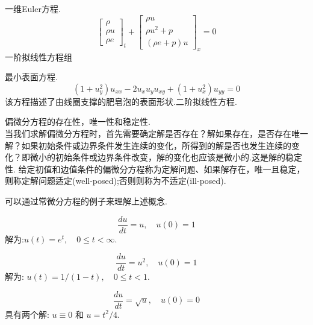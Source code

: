 	\begin{myexample}
		一维Euler方程.
		\begin{equation}
			\begin{bmatrix}
				\rho \\
				\rho u \\
				\rho e
			\end{bmatrix}_t + 
			\begin{bmatrix}
				\rho u \\
				\rho u^2 + p \\
				(\rho e + p)u
			\end{bmatrix}_x = 0
		\end{equation}
		一阶拟线性方程组
	\end{myexample}

	\begin{myexample}
		最小表面方程.
		\begin{equation}
			(1+u_y^2)u_{xx} - 2u_xu_yu_{xy} + (1+u_x^2)u_{yy} = 0
		\end{equation}
		该方程描述了由线圈支撑的肥皂泡的表面形状.二阶拟线性方程.
	\end{myexample}

	\begin{mydef}
		偏微分方程的存在性，唯一性和稳定性. \\
		当我们求解偏微分方程时，首先需要确定解是否存在？解如果存在，是否存在唯一解？如果初始条件或边界条件发生连续的变化，所得到的解是否也发生连续的变化？即微小的初始条件或边界条件改变，解的变化也应该是微小的.这是解的稳定性.
		给定初值和边值条件的偏微分方程称为定解问题、如果解存在，唯一且稳定，则称定解问题适定(well-posed);否则则称为不适定(ill-posed).
	\end{mydef}
	可以通过常微分方程的例子来理解上述概念.
	\begin{myexample}
		\begin{equation*}
			\frac{du}{dt}=u, \quad u(0)=1
		\end{equation*}
		解为:$u(t)=e^t, \quad 0\le t < \infty $.
	\end{myexample}

	\begin{myexample}
		\begin{equation*}
			\frac{du}{dt}=u^2, \quad u(0)=1
		\end{equation*}	
		解为: $u(t)=1/(1-t), \quad 0\le t < 1 $.	
	\end{myexample}

	\begin{myexample}
		\begin{equation*}
			\frac{du}{dt}=\sqrt u, \quad u(0)=0
		\end{equation*}	
		具有两个解: $u\equiv 0$ 和 $u=t^2/4$.
	\end{myexample}	

